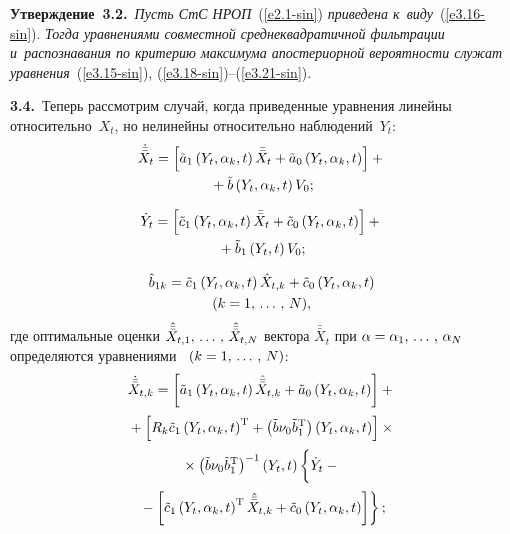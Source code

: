 \begin{multicols}{2}
\noindent
\textbf{Утверждение~3.2.}\ \textit{Пусть СтС НРОП}~(\ref{e2.1-sin}) \textit{приведена 
к~виду}~(\ref{e3.16-sin}). \textit{Тогда уравнениями совместной среднеквадратичной 
фильтрации и~распознавания по критерию максимума апостериорной вероятности служат 
уравнения}~(\ref{e3.15-sin}), (\ref{e3.18-sin})--(\ref{e3.21-sin}).



\smallskip


\textbf{3.4.}\ 
Теперь рассмотрим случай, когда приведенные уравнения линейны относительно~$X_t$, но нелинейны 
относительно наблюдений~$Y_t$:
    \begin{multline}
    \dot{\bar{\bar X}}_t = \left[  \tilde a_1\left(Y_t,\alpha_k,t\right)\bar{\bar X}_t + 
    \tilde a_0 \left(Y_t,\alpha_k,t\right)\right] + {}\\
    {}+\tilde b\left(Y_t,\alpha_k,t\right)V_0;
    \label{e3.23-sin}
    \end{multline}
    
    \vspace*{-12pt}
    
    \noindent
\begin{multline}
\dot Y_t =\left[ \tilde c_1\left(Y_t,\alpha_k,t\right)\bar{\bar X}_t+ 
 \tilde c_0 \left(Y_t,\alpha_k,t\right)\right]  +{}\\
 {}+\tilde b_1 \left(Y_t,t\right) V_0;
 \label{e3.24-sin}
 \end{multline}
 
     \vspace*{-12pt}
    
    \noindent
    \begin{multline}
    \hat b_{1k} =  \tilde c_1 \left(Y_t,\alpha_k,t\right)\hat X_{t,k} +
    \tilde c_0 \left(Y_t,\alpha_k,t\right)\\
     (k=1,\,\ldots\,,\, N),\label{e3.25-sin}
    \end{multline}
где оптимальные оценки $\hat{\bar{\bar X}}_{t,1} ,\,\ldots\,,\, \hat{\bar{\bar X}}_{t,N}$  вектора
 $\bar{\bar X}_t$ при  $\alpha\hm=\alpha_1\tr \alpha_N$ определяются
уравнениями~\cite{7-sin}  $(k=1,\,\ldots\,,\, N)$:
   \begin{multline}
   \dot{\bar{\bar X}}_{t,k} = \left[  \tilde a_1 \left(Y_t,\alpha_k,t\right)\hat{\bar{\bar X}}_{t,k} + \tilde a_0 
    \left(Y_t,\alpha_k,t\right)\right] +{}\\[2pt]
{}+ \left[ R_k \tilde c_1 \left(Y_t,\alpha_k,t\right)^{\mathrm{T}}+
\left(\tilde b\nu_0\tilde b_1^{\mathrm{T}}\right) \left(Y_t,\alpha_k,t\right)\right] \times{}\\[2pt]
{}\times
\left(\tilde b\nu_0\tilde b_1^{\mathrm{T}}\right)^{-1} 
    \left(Y_t,t\right)
    \left\{ 
    \vphantom{\hat{\bar{\bar X}}_{t,k}}
    \dot Y_t -{}\right.\\[2pt]
\left.    {}-\left[ \tilde c_1 \left(Y_t,\alpha_k,t\right)^{\mathrm{T}}\hat{\bar{\bar X}}_{t,k}+
     \tilde c_0 \left(Y_t,\alpha_k,t\right)\right] \right\};
     \label{e3.26-sin}
     \end{multline}
     

\end{multicols}

